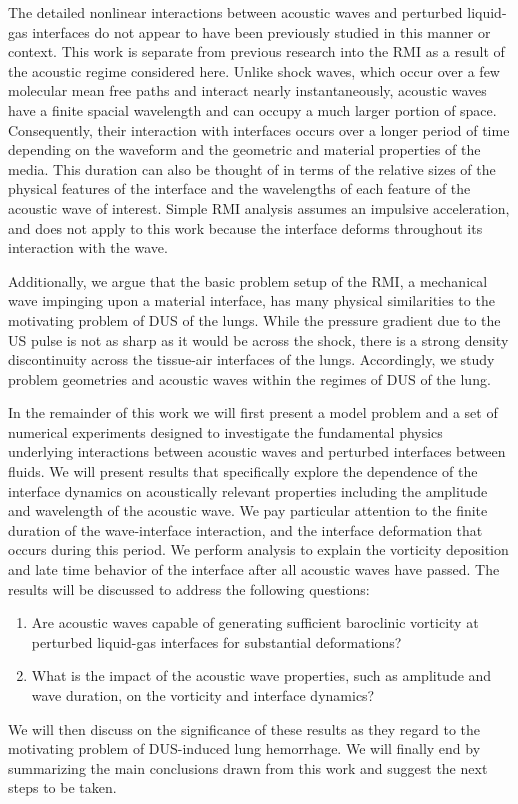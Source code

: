 The detailed nonlinear interactions between acoustic waves and
perturbed liquid-gas interfaces do not appear to have been previously
studied in this manner or context. This work is separate from previous
research into the \ac{RMI} as a result of the acoustic regime
considered here. Unlike shock waves, which occur over a few molecular
mean free paths and interact nearly instantaneously, acoustic waves
have a finite spacial wavelength and can occupy a much larger portion
of space. Consequently, their interaction with interfaces occurs over
a longer period of time depending on the waveform and the geometric
and material properties of the media. This duration can also be
thought of in terms of the relative sizes of the physical features of
the interface and the wavelengths of each feature of the acoustic wave
of interest. Simple \ac{RMI} analysis assumes an impulsive
acceleration, and does not apply to this work because the interface
deforms throughout its interaction with the wave.

Additionally, we argue that the basic problem setup of the \ac{RMI}, a
mechanical wave impinging upon a material interface, has many
physical similarities to the motivating problem of \ac{DUS} of the
lungs. While the pressure gradient due to the \ac{US} pulse is not as
sharp as it would be across the shock, there is a strong density
discontinuity across the tissue-air interfaces of the
lungs. Accordingly, we study problem geometries and acoustic waves
within the regimes of \ac{DUS} of the lung.

In the remainder of this work we will first present a model problem
and a set of numerical experiments designed to investigate the
fundamental physics underlying interactions between acoustic waves and
perturbed interfaces between fluids. We will present results that
specifically explore the dependence of the interface dynamics on
acoustically relevant properties including the amplitude and
wavelength of the acoustic wave. We pay particular attention to the
finite duration of the wave-interface interaction, and the interface
deformation that occurs during this period. We perform analysis to
explain the vorticity deposition and late time behavior of the
interface after all acoustic waves have passed. The results will be
discussed to address the following questions:
\begin{enumerate} \label{itm:usbe_lung_questions}
\item Are acoustic waves capable of generating sufficient baroclinic
  vorticity at perturbed liquid-gas interfaces for substantial
  deformations?
\item What is the impact of the acoustic wave properties, such as
  amplitude and wave duration, on the vorticity and interface
  dynamics?
\end{enumerate}
We will then discuss on the significance of these results as
they regard to the motivating problem of \ac{DUS}-induced lung
hemorrhage. We will finally end by summarizing the main conclusions
drawn from this work and suggest the next steps to be taken.



